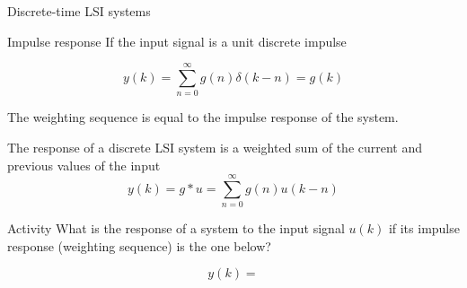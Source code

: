\documentclass[presentation,aspectratio=169]{beamer}
\begin{document}
\begin{frame}[label={sec:org5d0952b}]{Discrete-time LSI systems}
\begin{block}{Impulse response}
If the input signal is a unit discrete impulse

\begin{center}
\end{center}

\pause

\[ y(k) = \sum_{n=0}^\infty g(n) \delta(k-n) = g(k) \]

\alert{The weighting sequence is equal to the impulse response of the system.}
\end{block}
\end{frame}

\begin{frame}[label={sec:orge55d96a}]{The response of a discrete LSI system is a weighted sum of the current and previous values of the input}
\[ y(k) = g \ast u = \sum_{n=0}^\infty g(n) u(k-n) \]


\alert{Activity} What is the response of a system to the input signal \(u(k)\) if its impulse response (weighting sequence) is the one below?

\begin{center}
\end{center}

\[y(k) = \]
\end{frame}
\end{document}
